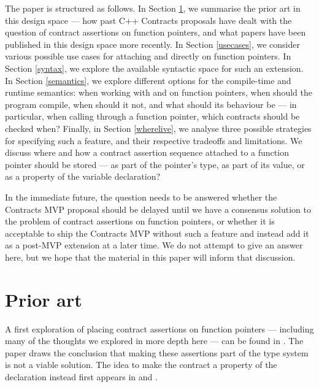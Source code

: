 The paper is structured as follows. In Section \ref{priorart}, we summarise the prior art in this design space --- how past C++ Contracts proposals have dealt with the question of contract assertions on function pointers, and what papers have been published in this design space more recently. In Section \ref{usecases}, we consider various possible use cases for attaching  and  directly on function pointers. In Section \ref{syntax}, we explore the available syntactic space for such an extension. In Section \ref{semantics}, we explore different options for the compile-time and runtime semantics: when working with  and  on function pointers, when should the program compile, when should it not, and what should its behaviour be --- in particular, when calling through a function pointer, which contracts should be checked when? Finally, in Section \ref{wherelive}, we analyse three possible strategies for specifying such a feature, and their respective tradeoffs and limitations. We discuss where and how a contract assertion sequence attached to a function pointer should be stored --- as part of the pointer's type, as part of its value, or as a property of the variable declaration?

In the immediate future, the question needs to be answered whether the Contracts MVP proposal \cite{P2900R8} should be delayed until we have a consensus solution to the problem of contract assertions on function pointers, or whether it is acceptable to ship the Contracts MVP without such a feature and instead add it as a post-MVP extension at a later time. We do not attempt to give an answer here, but we hope that the material in this paper will inform that discussion.


\section{Prior art}
\label{priorart}

A first exploration of placing contract assertions on function pointers --- including many of the thoughts we explored in more depth here --- can be found in \cite{N4110}. The paper draws the conclusion that making these assertions part of the type system is not a viable solution. The idea to make the contract a property of the declaration instead first appears in  \cite{P0246R0} and \cite{P0247R0}.

